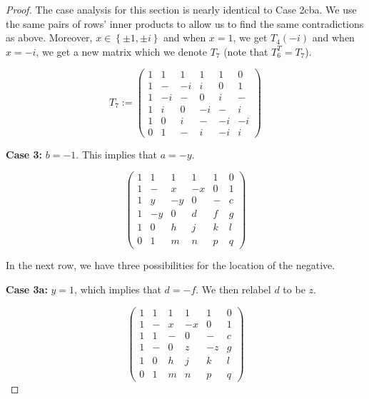 \begin{lemma}
\begin{proof}
The case analysis for this section is nearly identical to Case 2cba. We use the same pairs of rows' inner products to allow us to find the same contradictions as above. Moreover, $x \in \left\{\pm 1,\pm i\right\}$ and when $x = 1$, we get $T_4(-i)$ and when $x = -i$, we get a new matrix which we denote $T_7$ (note that $T_6^T = T_7$).

\begin{equation} \label{mat:t7}
T_7 := \left(\begin{array}{rrrrrr}
               1 &  1 & 1  &  1 &  1 & 0 \\
               1 &  - & -i & i &  0 & 1 \\
               1 &  -i & -  &  0 & i & - \\
               1 & i & 0  &  -i &  - & i \\
               1 &  0 & i &  - &  -i & -i \\
               0 &  1 & -  & i & -i & i
             \end{array}\right)
\end{equation}


{\bf Case 3:} $b = -1$. This implies that $a = -y$.

\begin{equation} \label{mat:3-1}
\left(\begin{array}{rrrrrr}
 1 &  1 & 1 & 1 & 1 & 0 \\
 1 &  - & x & -x & 0 & 1 \\ 
 1 &  y & -y & 0 & - & c \\ \hline
 1 &  -y & 0 & d & f & g \\
 1 &  0 & h & j & k & l \\
 0 &  1 & m & n & p & q
\end{array}\right)
\end{equation}

In the next row, we have three possibilities for the location of the negative.

{\bf Case 3a:} $y = 1$, which implies that $d = -f$. We then relabel $d$ to be $z$.

\begin{equation} \label{mat:3a-2}
\left(\begin{array}{rrrrrr}
 1 &  1 & 1 & 1 & 1 & 0 \\
 1 &  - & x & -x & 0 & 1 \\ 
 1 &  1 & - & 0 & - & c \\
 1 &  - & 0 & z & -z & g \\ \hline
 1 &  0 & h & j & k & l \\
 0 &  1 & m & n & p & q
\end{array}\right)
\end{equation}


\end{proof}
\end{lemma}
